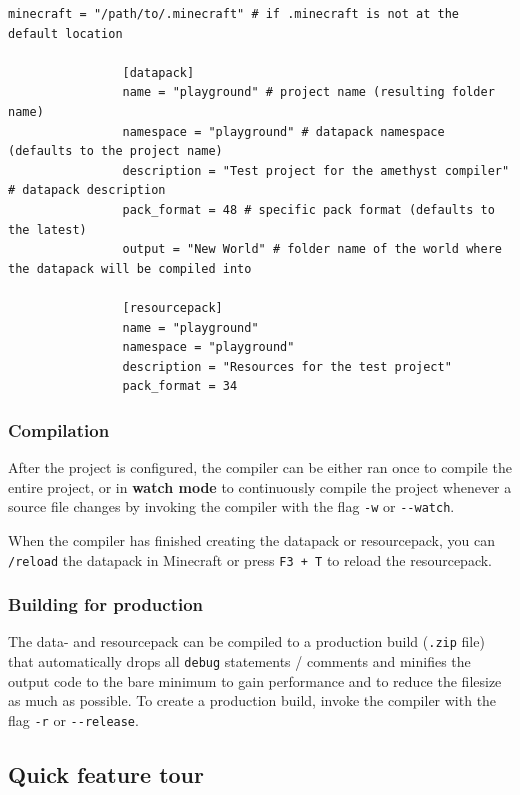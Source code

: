 \documentclass[12pt]{article}
\begin{document}
            \begin{lstlisting}[numbers=none]
                minecraft = "/path/to/.minecraft" # if .minecraft is not at the default location
                
                [datapack]
                name = "playground" # project name (resulting folder name)
                namespace = "playground" # datapack namespace (defaults to the project name)
                description = "Test project for the amethyst compiler" # datapack description
                pack_format = 48 # specific pack format (defaults to the latest)
                output = "New World" # folder name of the world where the datapack will be compiled into
                
                [resourcepack]
                name = "playground"
                namespace = "playground"
                description = "Resources for the test project"
                pack_format = 34
            \end{lstlisting}
            
        \subsubsection{Compilation}
            After the project is configured, the compiler can be either ran once to compile the entire project, or in \textbf{watch mode} to continuously compile the project whenever a source file changes by invoking the compiler with the flag \lstinline{-w} or \lstinline{--watch}.
            
            When the compiler has finished creating the datapack or resourcepack, you can \lstinline{/reload} the datapack in Minecraft or press \lstinline{F3 + T} to reload the resourcepack.
        
        \subsubsection{Building for production}
            The data- and resourcepack can be compiled to a production build (\lstinline{.zip} file) that automatically drops all \lstinline{debug} statements / comments and minifies the output code to the bare minimum to gain performance and to reduce the filesize as much as possible. To create a production build, invoke the compiler with the flag \lstinline{-r} or \lstinline{--release}.
        
    \subsection{Quick feature tour}
\end{document}
